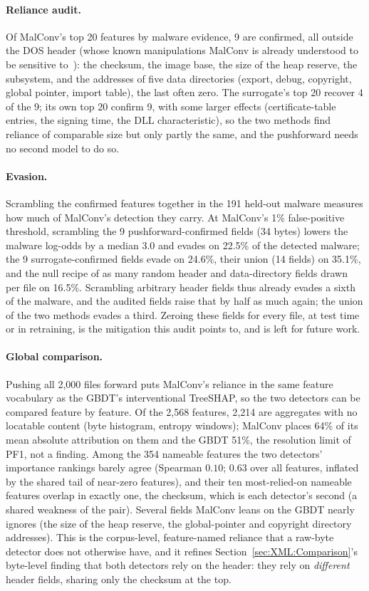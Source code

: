 \paragraph{Reliance audit.} Of MalConv's top 20 features by malware evidence, 9 are confirmed, all outside the DOS header (whose known manipulations MalConv is already understood to be sensitive to~\cite{demetrio2019explaining}): the checksum, the image base, the size of the heap reserve, the subsystem, and the addresses of five data directories (export, debug, copyright, global pointer, import table), the last often zero. The surrogate's top 20 recover 4 of the 9; its own top 20 confirm 9, with some larger effects (certificate-table entries, the signing time, the DLL characteristic), so the two methods find reliance of comparable size but only partly the same, and the pushforward needs no second model to do so.

\paragraph{Evasion.} Scrambling the confirmed features together in the 191 held-out malware measures how much of MalConv's detection they carry. At MalConv's 1\% false-positive threshold, scrambling the 9 pushforward-confirmed fields (34 bytes) lowers the malware log-odds by a median 3.0 and evades on 22.5\% of the detected malware; the 9 surrogate-confirmed fields evade on 24.6\%, their union (14 fields) on 35.1\%, and the null recipe of as many random header and data-directory fields drawn per file on 16.5\%. Scrambling arbitrary header fields thus already evades a sixth of the malware, and the audited fields raise that by half as much again; the union of the two methods evades a third. Zeroing these fields for every file, at test time or in retraining, is the mitigation this audit points to, and is left for future work.

\paragraph{Global comparison.} Pushing all 2{,}000 files forward puts MalConv's reliance in the same feature vocabulary as the GBDT's interventional TreeSHAP, so the two detectors can be compared feature by feature. Of the 2{,}568 features, 2{,}214 are aggregates with no locatable content (byte histogram, entropy windows); MalConv places 64\% of its mean absolute attribution on them and the GBDT 51\%, the resolution limit of PF1, not a finding. Among the 354 nameable features the two detectors' importance rankings barely agree (Spearman $0.10$; $0.63$ over all features, inflated by the shared tail of near-zero features), and their ten most-relied-on nameable features overlap in exactly one, the checksum, which is each detector's second (a shared weakness of the pair). Several fields MalConv leans on the GBDT nearly ignores (the size of the heap reserve, the global-pointer and copyright directory addresses). This is the corpus-level, feature-named reliance that a raw-byte detector does not otherwise have, and it refines Section~\ref{sec:XML:Comparison}'s byte-level finding that both detectors rely on the header: they rely on \emph{different} header fields, sharing only the checksum at the top.

